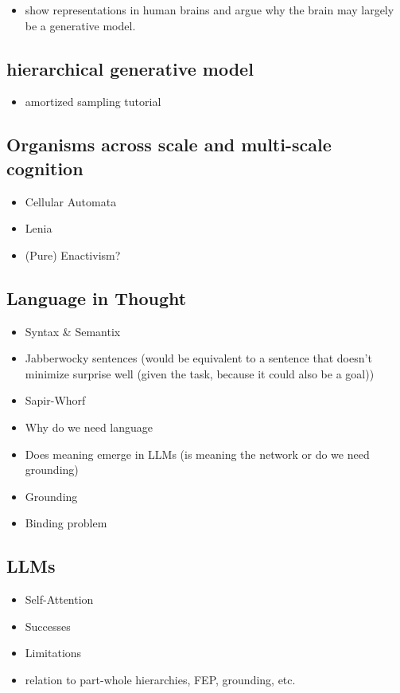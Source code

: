 \begin{itemize}
    \item show representations in human brains and argue why the brain may largely be a generative model. 
\end{itemize}



\subsection{hierarchical generative model}
\begin{itemize}
    \item amortized sampling tutorial
\end{itemize}

\subsection{Organisms across scale and multi-scale cognition}

\begin{itemize}
    \item Cellular Automata
    \item Lenia
    \item (Pure) Enactivism?
\end{itemize}

\subsection{Language in Thought}
\begin{itemize}
    \item Syntax \& Semantix
    \item Jabberwocky sentences (would be equivalent to a sentence that doesn't minimize surprise well (given the task, because it could also be a goal))
\end{itemize}

\begin{itemize}
    \item Sapir-Whorf
    \item Why do we need language
    \item Does meaning emerge in LLMs (is meaning the network or do we need grounding)
    \item Grounding
    \item Binding problem
\end{itemize}

\subsection{LLMs}
\begin{itemize}
    \item Self-Attention
    \item Successes
    \item Limitations
    \item relation to part-whole hierarchies, FEP, grounding, etc. 
\end{itemize}

